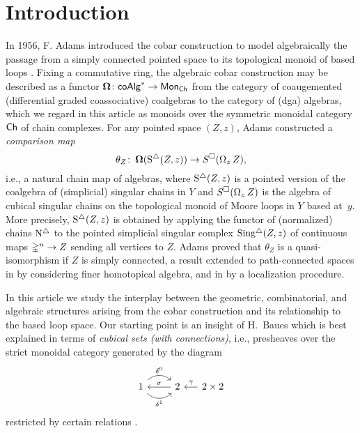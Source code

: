 
\section{Introduction}

In 1956, F. Adams introduced the cobar construction to model algebraically the passage from a simply connected pointed space to its topological monoid of based loops \cite{adams1956cobar}.
Fixing a commutative ring, the algebraic cobar construction may be described as a functor $\operatorname{\mathbf{\Omega}} \colon \mathsf{coAlg}^\ast \to \mathsf{Mon}_{\mathsf{Ch}}$ from the category of coaugemented  (differential graded coassociative) coalgebras to the category of (dga) algebras, which we regard in this article as monoids over the symmetric monoidal category $\mathsf{Ch}$ of chain complexes.
For any pointed space $(Z, z)$, Adams constructed a \textit{comparison map}
\begin{equation} \label{e:adams map}
\theta_Z \colon \operatorname{\mathbf{\Omega}}(\operatorname{S^{\triangle}}(Z, z)) \to S^{\square}(\operatorname{\Omega}_z Z),
\end{equation}
i.e., a natural chain map of algebras, where $\operatorname{S^{\triangle}}(Z,z)$ is a pointed version of the coalgebra of (simplicial) singular chains in $Y$ and $S^{\square}(\operatorname{\Omega}_zZ)$ is the algebra of cubical singular chains on the topological monoid of Moore loops in $Y$ based at~$y$.
More precisely, $\operatorname{S^{\triangle}}(Z,z)$ is obtained by applying the functor of (normalized) chains $\operatorname{N^{\triangle}}$ to the pointed simplicial singular complex $\operatorname{Sing^{\triangle}}(Z, z)$ of continuous maps $\mathbb{\Delta}^n \to Z$ sending all vertices to $Z$.
Adams proved that $\theta_Z$ is a quasi-isomorphism if $Z$ is simply connected, a result extended to path-connected spaces in \cite{rivera2018cubical} by considering finer homotopical algebra, and in \cite{hess2010cobar} by a localization procedure.

In this article we study the interplay between the geometric, combinatorial, and algebraic structures arising from the cobar construction and its relationship to the based loop space.
Our starting point is an insight of H.~Baues which is best explained in terms of \textit{cubical sets (with connections)}, i.e., presheaves over the 
strict monoidal category generated by the diagram
\[
\begin{tikzcd}
1 \arrow[r, out=45, in=135, "\delta^0"] \arrow[r, out=-45, in=-135, "\delta^1"'] & 2 \arrow[l, "\sigma"'] &[-10pt] \arrow[l, "\gamma"'] 2 \times 2
\end{tikzcd}
\]
restricted by certain relations \cite{brown1981cubes, grandis2003cubical}.

